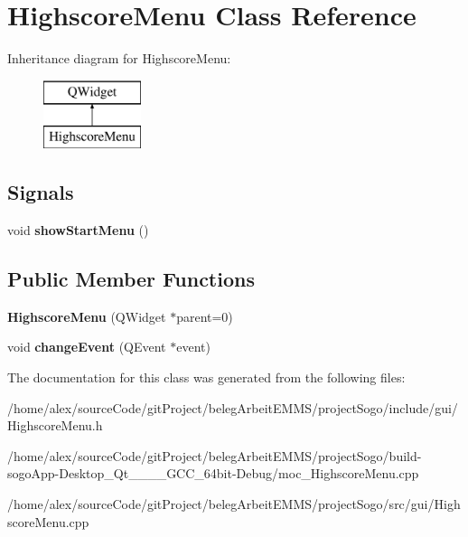 \hypertarget{classHighscoreMenu}{\section{Highscore\-Menu Class Reference}
\label{classHighscoreMenu}
}
Inheritance diagram for Highscore\-Menu\-:\begin{figure}[H]
\begin{center}
\leavevmode
\includegraphics[height=2.000000cm]{classHighscoreMenu}
\end{center}
\end{figure}
\subsection*{Signals}
\begin{DoxyCompactItemize}
\item 
\hypertarget{classHighscoreMenu_acfc660f3078cc3e42a2b0be20f534e59}{void {\bfseries show\-Start\-Menu} ()}\label{classHighscoreMenu_acfc660f3078cc3e42a2b0be20f534e59}

\end{DoxyCompactItemize}
\subsection*{Public Member Functions}
\begin{DoxyCompactItemize}
\item 
\hypertarget{classHighscoreMenu_afffd6ba37985beae539f7d143de2201d}{{\bfseries Highscore\-Menu} (Q\-Widget $\ast$parent=0)}\label{classHighscoreMenu_afffd6ba37985beae539f7d143de2201d}

\item 
\hypertarget{classHighscoreMenu_ad71f69706ab1969e180abc4794f946c9}{void {\bfseries change\-Event} (Q\-Event $\ast$event)}\label{classHighscoreMenu_ad71f69706ab1969e180abc4794f946c9}

\end{DoxyCompactItemize}


The documentation for this class was generated from the following files\-:\begin{DoxyCompactItemize}
\item 
/home/alex/source\-Code/git\-Project/beleg\-Arbeit\-E\-M\-M\-S/project\-Sogo/include/gui/Highscore\-Menu.\-h\item 
/home/alex/source\-Code/git\-Project/beleg\-Arbeit\-E\-M\-M\-S/project\-Sogo/build-\/sogo\-App-\/\-Desktop\-\_\-\-Qt\-\_\-\_\-\_\-\_\-\-G\-C\-C\-\_\-64bit-\/\-Debug/moc\-\_\-\-Highscore\-Menu.\-cpp\item 
/home/alex/source\-Code/git\-Project/beleg\-Arbeit\-E\-M\-M\-S/project\-Sogo/src/gui/Highscore\-Menu.\-cpp\end{DoxyCompactItemize}
